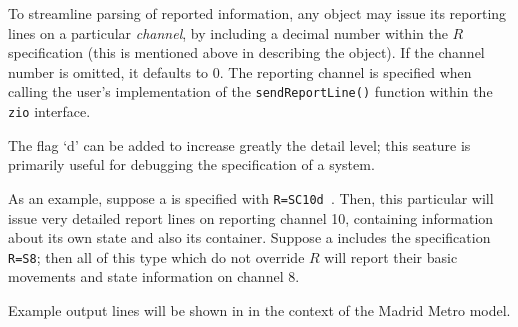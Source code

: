 To streamline parsing of reported information, any object may issue its reporting
lines on a particular \emph{channel}, by including a decimal number within
the $R$ specification (this is mentioned above in describing the  object).
If the channel number is omitted, it defaults to $0$.
The reporting channel is specified when calling the user's implementation of the
{\tt sendReportLine()} function within the {\tt zio} interface.

The flag `d' can be added to increase greatly the detail level; this
seature is primarily useful for debugging the specification of a
system.

As an example, suppose a  is specified with
{\tt R=SC10d }.
Then, this particular  will issue very detailed report lines on reporting channel 10, containing
information about its own state and also its container.
Suppose a  includes the specification {\tt R=S8};
then all  of this type which do not override $R$ will
report their basic movements and state information on channel $8$.

Example output lines will be shown in  in the context of the Madrid Metro model.
